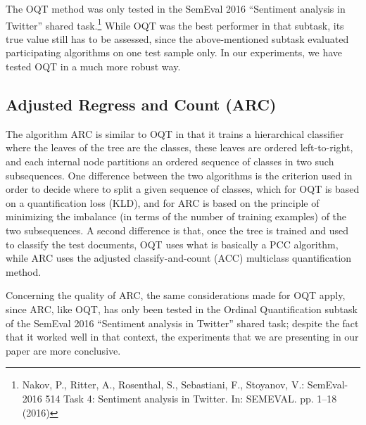 \documentclass[10pt,a4paper]{article}
\begin{document}
The OQT method was only tested in the SemEval 2016 ``Sentiment
analysis in Twitter'' shared task.\footnote{Nakov, P., Ritter, A., Rosenthal, S., Sebastiani, F., Stoyanov, V.: SemEval-2016 514
Task 4: Sentiment analysis in Twitter. In: SEMEVAL. pp. 1–18 (2016)}
While OQT was
the best performer in that subtask, its true value still has to be
assessed, since the above-mentioned subtask evaluated participating
algorithms on one test sample only. In %
our experiments,
we
have tested OQT in a much more robust way.


\subsection{Adjusted Regress and Count (ARC)}
\label{sec:ARC}

\noindent The algorithm ARC
is similar to OQT in
that it trains a hierarchical classifier where the leaves of the tree
are the classes, these leaves are ordered left-to-right, and each
internal node partitions an ordered sequence of classes in two such
subsequences. One difference between the two algorithms is the
criterion used in order to decide where to split a given sequence of
classes, which for OQT is based on a quantification loss (KLD), and
for ARC is based on the principle of minimizing the imbalance (in
terms of the number of training examples) of the two subsequences. A
second difference is that, once the tree is trained and used to
classify the test documents, OQT uses what is basically a PCC
algorithm, while ARC uses the adjusted classify-and-count (ACC)
multiclass quantification method.%

Concerning the quality of ARC, the same considerations made for OQT
apply, since ARC, like OQT, has only been tested in the Ordinal
Quantification subtask of the SemEval 2016 ``Sentiment analysis in
Twitter'' shared task; despite the fact that it worked well in that
context, the experiments that we are presenting in
our paper
are more conclusive.
\end{document}
